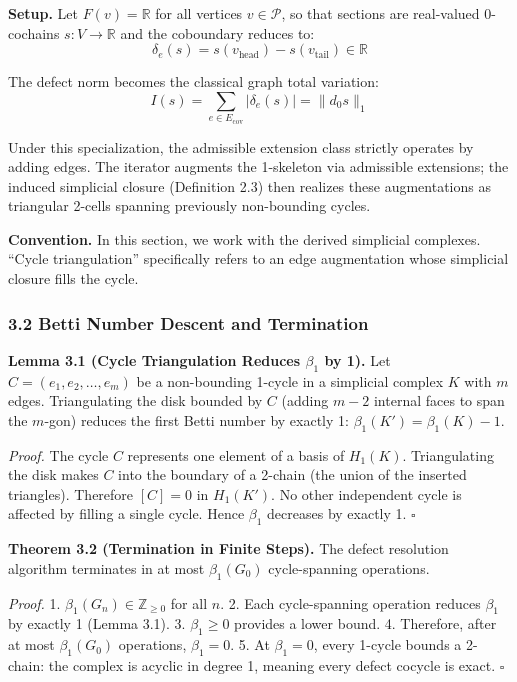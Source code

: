 \documentclass[
]{article}
\begin{document}
\textbf{Setup.} Let \(F(v) = \mathbb{R}\) for all vertices
\(v \in \mathcal{P}\), so that sections are real-valued 0-cochains
\(s: V \to \mathbb{R}\) and the coboundary reduces to:
\[\delta_e(s) = s(v_{\text{head}}) - s(v_{\text{tail}}) \in \mathbb{R}\]

The defect norm becomes the classical graph total variation:
\[I(s) = \sum_{e \in E_{\text{cov}}} |\delta_e(s)| = \|d_0 s\|_1\]

Under this specialization, the admissible extension class strictly
operates by adding edges. The iterator augments the 1-skeleton via
admissible extensions; the induced simplicial closure (Definition 2.3)
then realizes these augmentations as triangular 2-cells spanning
previously non-bounding cycles.

\textbf{Convention.} In this section, we work with the derived
simplicial complexes. ``Cycle triangulation'' specifically refers to an
edge augmentation whose simplicial closure fills the cycle.

\subsubsection{3.2 Betti Number Descent and
Termination}\label{betti-number-descent-and-termination}

\textbf{Lemma 3.1 (Cycle Triangulation Reduces \(\beta_1\) by 1).} Let
\(C = (e_1, e_2, \ldots, e_m)\) be a non-bounding 1-cycle in a
simplicial complex \(K\) with \(m\) edges. Triangulating the disk
bounded by \(C\) (adding \(m-2\) internal faces to span the \(m\)-gon)
reduces the first Betti number by exactly 1:
\(\beta_1(K') = \beta_1(K) - 1\).

\emph{Proof.} The cycle \(C\) represents one element of a basis of
\(H_1(K)\). Triangulating the disk makes \(C\) into the boundary of a
2-chain (the union of the inserted triangles). Therefore \([C] = 0\) in
\(H_1(K')\). No other independent cycle is affected by filling a single
cycle. Hence \(\beta_1\) decreases by exactly 1. \(\square\)

\textbf{Theorem 3.2 (Termination in Finite Steps).} The defect
resolution algorithm terminates in at most \(\beta_1(G_0)\)
cycle-spanning operations.

\emph{Proof.} 1. \(\beta_1(G_n) \in \mathbb{Z}_{\geq 0}\) for all \(n\).
2. Each cycle-spanning operation reduces \(\beta_1\) by exactly 1 (Lemma
3.1). 3. \(\beta_1 \geq 0\) provides a lower bound. 4. Therefore, after
at most \(\beta_1(G_0)\) operations, \(\beta_1 = 0\). 5. At
\(\beta_1 = 0\), every 1-cycle bounds a 2-chain: the complex is acyclic
in degree 1, meaning every defect cocycle is exact. \(\square\)
\end{document}

